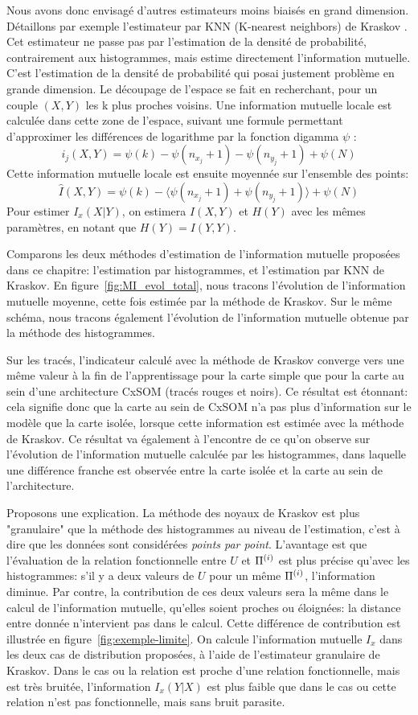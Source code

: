 Nous avons donc envisagé d'autres estimateurs moins biaisés en grand dimension. Détaillons par exemple l'estimateur par KNN (K-nearest neighbors) de Kraskov \cite{2004kraskov}. 
Cet estimateur ne passe pas par l'estimation de la densité de probabilité, contrairement aux histogrammes, mais estime directement l'information mutuelle. C'est l'estimation de la densité de probabilité qui posai justement problème en grande dimension.
Le découpage de l'espace se fait en recherchant, pour un couple $(X,Y)$ les k plus proches voisins. Une information mutuelle locale est calculée dans cette zone de l'espace, suivant une formule permettant d'approximer les différences de logarithme par la fonction digamma $\psi$ : 
$$i_j(X,Y) = \psi(k) - \psi(n_{x_j} + 1) - \psi(n_{y_j} +1) + \psi(N)$$
Cette information mutuelle locale est ensuite moyennée sur l'ensemble des points: 
$$\hat{I}(X,Y) = \psi(k) - \langle\psi(n_{x_j} + 1) + \psi(n_{y_j} +1)\rangle + \psi(N)$$
Pour estimer $I_x(X|Y)$, on estimera $I(X,Y)$ et $H(Y)$ avec les mêmes paramètres, en notant que $H(Y) = I(Y,Y)$.

Comparons les deux méthodes d'estimation de l'information mutuelle proposées dans ce chapitre: l'estimation par histogrammes, et l'estimation par KNN de Kraskov.
En figure~\ref{fig:MI_evol_total}, nous tracons l'évolution de l'information mutuelle moyenne, cette fois estimée par la méthode de Kraskov. Sur le même schéma, nous tracons également l'évolution de l'information mutuelle obtenue par la méthode des histogrammes. 

Sur les tracés, l'indicateur calculé avec la méthode de Kraskov converge vers une même valeur à la fin de l'apprentissage pour la carte simple que pour la carte au sein d'une architecture CxSOM (tracés rouges et noirs). Ce résultat est étonnant: cela signifie donc que la carte au sein de CxSOM n'a pas plus d'information sur le modèle que la carte isolée, lorsque cette information est estimée avec la méthode de Kraskov. Ce résultat va également à l'encontre de ce qu'on observe sur l'évolution de l'information mutuelle calculée par les histogrammes, dans laquelle une différence franche est observée entre la carte isolée et la carte au sein de l'architecture.

Proposons une explication.
La méthode des noyaux de Kraskov est plus "granulaire" que la méthode des histogrammes au niveau de l'estimation, c'est à dire que les données sont considérées \emph{points par point}. L'avantage est que l'évaluation de la relation fonctionnelle entre $U$ et $\Pi^{({i})}$ est plus précise qu'avec les histogrammes: s'il y a deux valeurs de $U$ pour un même $\Pi^{({i})}$, l'information diminue. Par contre, la contribution de ces deux valeurs sera la même dans le calcul de l'information mutuelle, qu'elles soient proches ou éloignées: la distance entre donnée n'intervient pas dans le calcul. Cette différence de contribution est illustrée en figure~\ref{fig:exemple-limite}. On calcule l'information mutuelle $I_x$ dans les deux cas de distribution proposées, à l'aide de l'estimateur granulaire de Kraskov. Dans le cas ou la relation est proche d'une relation fonctionnelle, mais est très bruitée, l'information $I_x(Y|X)$ est plus faible que dans le cas ou cette relation n'est pas fonctionnelle, mais sans bruit parasite.

